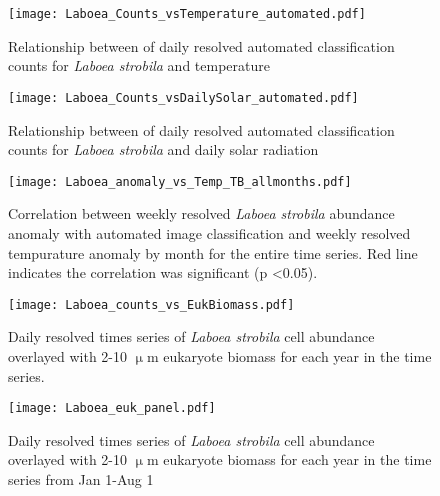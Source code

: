 \graphicspath{ {Chapter3_Figures/} }
\begin{figure}
\texttt{[image: Laboea\_Counts\_vsTemperature\_automated.pdf]}
\caption [Relationship between \textit{Laboea strobila} and temperature] {Relationship between of daily resolved automated classification counts for \textit{Laboea strobila} and temperature}
\end{figure}

\graphicspath{ {Chapter3_Figures/} }
\begin{figure}
\texttt{[image: Laboea\_Counts\_vsDailySolar\_automated.pdf]}
\caption [Relationship between \textit{Laboea strobila} and solar radiation] {Relationship between of daily resolved automated classification counts for \textit{Laboea strobila} and daily solar radiation}
\end{figure}

\graphicspath{ {Chapter3_Figures/} }
\begin{figure}
\texttt{[image: Laboea\_anomaly\_vs\_Temp\_TB\_allmonths.pdf]}
\caption [\textit{Laboea strobila} abundance anomaly vs. temperature anomaly] {Correlation between weekly resolved \textit{Laboea strobila} abundance anomaly with automated image classification and weekly resolved tempurature anomaly by month for the entire time series. Red line indicates the correlation was significant (p <0.05).}
\end{figure}

\graphicspath{ {Chapter3_Figures/} }
\begin{figure}
\texttt{[image: Laboea\_counts\_vs\_EukBiomass.pdf]}
\caption [\textit{Laboea strobila} and 2-10 $\upmu$m eukaryote biomass] {Daily resolved times series of \textit{Laboea strobila} cell abundance overlayed with 2-10 $\upmu$m eukaryote biomass for each year in the time series.}
\end{figure}

\graphicspath{ {Chapter3_Figures/} }
\begin{figure}
\texttt{[image: Laboea\_euk\_panel.pdf]}
\caption [Winter and spring \textit{Laboea strobila} and 2-10 $\upmu$m eukaryote biomass] {Daily resolved times series of \textit{Laboea strobila} cell abundance overlayed with 2-10 $\upmu$m eukaryote biomass for each year in the time series from Jan 1-Aug 1}
\end{figure}


